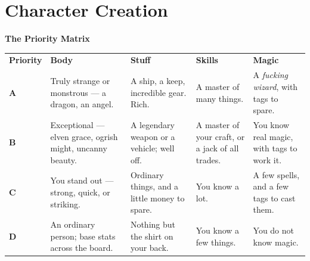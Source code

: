\chapter{Character Creation}

\begin{strip}
  \begingroup\centering
  {\hdfont\Large\bfseries\color{\realmaccent} The Priority Matrix\par}
  \vspace{10pt}
  \endgroup
  \begingroup
  \setlength{\tabcolsep}{7pt}\renewcommand{\arraystretch}{1.35}
  \centering\begin{tabularx}{\textwidth}{@{}>{\centering\arraybackslash}p{1.6cm} *{4}{Y}@{}}
  \rowcolor{\realmaccent}
  {\leavevmode\hdfont\bfseries\color{white}Priority} &
  {\leavevmode\hdfont\bfseries\color{white}Body}   &
  {\leavevmode\hdfont\bfseries\color{white}Stuff}  &
  {\leavevmode\hdfont\bfseries\color{white}Skills} &
  {\leavevmode\hdfont\bfseries\color{white}Magic}  \\
  {\leavevmode\hdfont\LARGE\bfseries\color{\realmaccent}A}
    & Truly strange or monstrous --- a dragon, an angel.
    & A ship, a keep, incredible gear. Rich.
    & A master of many things.
    & A \emph{fucking wizard}, with tags to spare. \\
  {\leavevmode\hdfont\LARGE\bfseries\color{\realmaccent}B}
    & Exceptional --- elven grace, ogrish might, uncanny beauty.
    & A legendary weapon or a vehicle; well off.
    & A master of your craft, or a jack of all trades.
    & You know real magic, with tags to work it. \\
  {\leavevmode\hdfont\LARGE\bfseries\color{\realmaccent}C}
    & You stand out --- strong, quick, or striking.
    & Ordinary things, and a little money to spare.
    & You know a lot.
    & A few spells, and a few tags to cast them. \\
  {\leavevmode\hdfont\LARGE\bfseries\color{\realmaccent}D}
    & An ordinary person; base stats across the board.
    & Nothing but the shirt on your back.
    & You know a few things.
    & You do not know magic. \\
  \end{tabularx}
  \endgroup
\end{strip}

